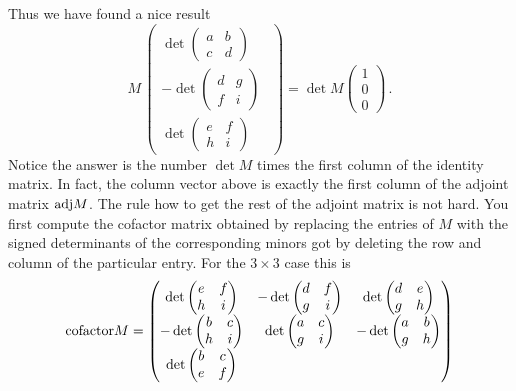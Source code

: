{Thus we have found a nice result
$$
M \, \begin{pmatrix} \det\begin{pmatrix}a&b\\c&d\end{pmatrix}\\[2mm]
-\det\begin{pmatrix}d&g\\f&i\end{pmatrix}\ \ \\[2mm]
\det\begin{pmatrix}e&f\\h&i\end{pmatrix}\end{pmatrix}
=\det M \begin{pmatrix}1\\0\\0\end{pmatrix}\, .
$$
Notice the answer is the number $\det M$ times the first column of the identity matrix.
In fact, the column vector above is exactly the first column of the adjoint matrix ${\rm adj} M$.
The rule how to get the rest of the adjoint matrix is not hard. You first compute the cofactor matrix obtained by replacing the entries of $M$ with the signed determinants of the corresponding 
minors got by deleting the row and column of the particular entry. For the $3\times 3$ case this is
$$
{\rm cofactor} M = 
\begin{pmatrix} \det\begin{pmatrix}e&f\\h&i\end{pmatrix}
&-\det\begin{pmatrix}d&f\\g&i\end{pmatrix}
&\det\begin{pmatrix}d&e\\g&h\end{pmatrix}
\\[2mm]
-\det\begin{pmatrix}b&c\\h&i\end{pmatrix}
&\det\begin{pmatrix}a&c\\g&i\end{pmatrix}
&-\det\begin{pmatrix}a&b\\g&h\end{pmatrix}\\[2mm]
\det\begin{pmatrix}b&c\\e&f\end{pmatrix}

\end{pmatrix}$$}
